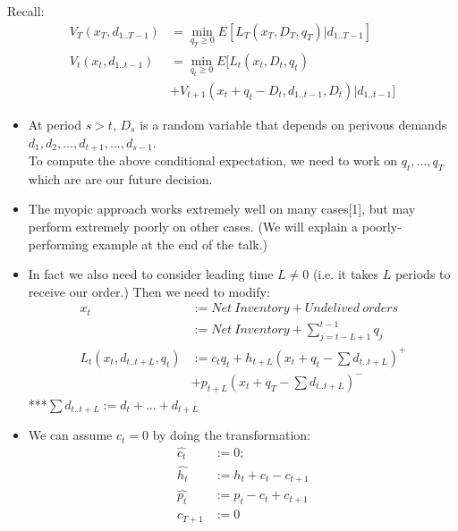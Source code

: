 \documentclass{beamer}
\begin{document}
\begin{frame}
Recall: 
    \begin{align}
    V_T(x_T,d_{1..T-1}) &= \min_{q_T \geq 0} E[L_T(x_T,D_T,q_T) | d_{1..T-1}] \nonumber\\
    V_t(x_t,d_{1..t-1}) &= \min_{q_t \geq 0} E[L_t(x_t,D_t,q_t)\nonumber\\
    & +V_{t+1}(x_t + q_t - D_t, d_{1..t-1},D_t)|d_{1..t-1}]\nonumber
    \end{align}
    \begin{itemize}
      \item 
        At period $s>t$, $D_s$ is a random variable that depends on perivous demands $d_1, d_2,...,d_{t+1},...,d_{s-1}$.\\
        To compute the above conditional expectation, we need to work on $q_t,...,q_T$ which are are our future decision.\\
      \item
        The myopic approach works extremely well on many cases[1], but may perform extremely poorly on other cases. (We will explain a poorly-performing example at the end of the talk.)
    \end{itemize}
\end{frame}


\begin{frame}
    \begin{itemize}
      \item
        In fact we also need to consider leading time $L \neq 0$ (i.e. it takes $L$ periods to receive our order.) Then we need to modify:
        \begin{align}
          x_t & := Net~Inventory + Undelived~orders\nonumber\\
              & := Net~Inventory + \sum_{j = t - L+1}^{t-1} q_j\nonumber\\
          L_t(x_t,d_{t..t+L},q_t)& :=c_tq_t + h_{t+L}(x_t + q_t - \sum d_{t..t+L})^{+} \nonumber\\
                                &  + p_{t+L}(x_t + q_T - \sum d_{t..t+L})^{-}\nonumber
        \end{align}
        ***$ \sum d_{t..t+L} := d_t + ... + d_{t+L}$\\
      \item
        We can assume $c_t = 0$ by doing the transformation:
        \begin{align}
          \hat{c_t} &:= 0;\nonumber\\
          \hat{h_t} &:= h_t + c_t - c_{t+1}\nonumber\\
          \hat{p_t} &:= p_t - c_t + c_{t+1}\nonumber\\
          c_{T+1} &:= 0\nonumber
        \end{align}
      \end{itemize}
\end{frame}
\end{document}
